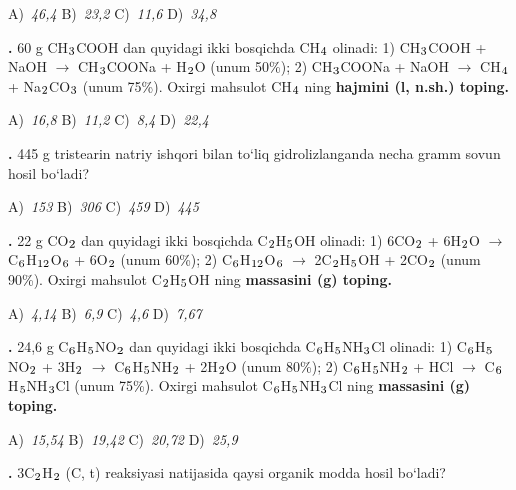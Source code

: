 \documentclass[11pt,a4paper]{article}
\renewcommand{\textsubscript}[1]{\ensuremath{_{\text{\fontsize{8}{8}\selectfont #1}}}}
\newcommand{\qn}[1]{\textbf{\fontsize{11.5}{13}\selectfont #1}}
\newcommand{\qsep}{\par\vspace{1pt}\noindent\rule{0pt}{0.4pt}\par\vspace{5pt}}
\begin{document}
\begin{multicols}{2}
\noindent A)~\textsl{46,4} \hfill B)~\textsl{23,2} \hfill C)~\textsl{11,6} \hfill D)~\textsl{34,8}\par
\qsep
\noindent\qn{25.} 60 g CH\textsubscript{3}COOH dan quyidagi ikki bosqichda CH\textsubscript{4} olinadi: 1) CH\textsubscript{3}COOH + NaOH $\to$ CH\textsubscript{3}COONa + H\textsubscript{2}O (unum 50\%); 2) CH\textsubscript{3}COONa + NaOH $\to$ CH\textsubscript{4} + Na\textsubscript{2}CO\textsubscript{3} (unum 75\%). Oxirgi mahsulot CH\textsubscript{4} ning \textbf{hajmini (l, n.sh.) toping.}

\noindent A)~\textsl{16,8} \hfill B)~\textsl{11,2} \hfill C)~\textsl{8,4} \hfill D)~\textsl{22,4}\par
\qsep
\noindent\qn{26.} 445 g tristearin natriy ishqori bilan to`liq gidrolizlanganda necha gramm sovun hosil bo`ladi?

\noindent A)~\textsl{153} \hfill B)~\textsl{306} \hfill C)~\textsl{459} \hfill D)~\textsl{445}\par
\qsep
\noindent\qn{27.} 22 g CO\textsubscript{2} dan quyidagi ikki bosqichda C\textsubscript{2}H\textsubscript{5}OH olinadi: 1) 6CO\textsubscript{2} + 6H\textsubscript{2}O $\to$ C\textsubscript{6}H\textsubscript{12}O\textsubscript{6} + 6O\textsubscript{2} (unum 60\%); 2) C\textsubscript{6}H\textsubscript{12}O\textsubscript{6} $\to$ 2C\textsubscript{2}H\textsubscript{5}OH + 2CO\textsubscript{2} (unum 90\%). Oxirgi mahsulot C\textsubscript{2}H\textsubscript{5}OH ning \textbf{massasini (g) toping.}

\noindent A)~\textsl{4,14} \hfill B)~\textsl{6,9} \hfill C)~\textsl{4,6} \hfill D)~\textsl{7,67}\par
\qsep
\noindent\qn{28.} 24,6 g C\textsubscript{6}H\textsubscript{5}NO\textsubscript{2} dan quyidagi ikki bosqichda C\textsubscript{6}H\textsubscript{5}NH\textsubscript{3}Cl olinadi: 1) C\textsubscript{6}H\textsubscript{5}NO\textsubscript{2} + 3H\textsubscript{2} $\to$ C\textsubscript{6}H\textsubscript{5}NH\textsubscript{2} + 2H\textsubscript{2}O (unum 80\%); 2) C\textsubscript{6}H\textsubscript{5}NH\textsubscript{2} + HCl $\to$ C\textsubscript{6}H\textsubscript{5}NH\textsubscript{3}Cl (unum 75\%). Oxirgi mahsulot C\textsubscript{6}H\textsubscript{5}NH\textsubscript{3}Cl ning \textbf{massasini (g) toping.}

\noindent A)~\textsl{15,54} \hfill B)~\textsl{19,42} \hfill C)~\textsl{20,72} \hfill D)~\textsl{25,9}\par
\qsep
\noindent\qn{29.} 3C\textsubscript{2}H\textsubscript{2} (C, t) reaksiyasi natijasida qaysi organik modda hosil bo`ladi?


\end{multicols}
\end{document}
